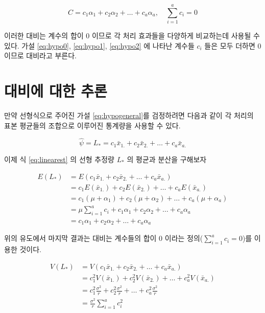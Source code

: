 \documentclass[
]{book}
\begin{document}
\begin{equation}
C = c_1 \alpha_1 + c_2 \alpha_2 + \dots + c_a \alpha_a, \quad \sum_{i=1}^a c_i =0
\label{eq:contrast}
\end{equation}

이러한 대비는 계수의 합이 0 이므로 각 처리 효과들을 다양하게 비교하는데 사용될 수 있다. 가설 \eqref{eq:hypo0}, \eqref{eq:hypo1}, \eqref{eq:hypo2} 에 나타난 계수들 \(c_i\) 들은 모두 더하면 0이므로 대비라고 부른다.

\hypertarget{uxb300uxbe44uxc5d0-uxb300uxd55c-uxcd94uxb860}{%
\section{대비에 대한 추론}\label{uxb300uxbe44uxc5d0-uxb300uxd55c-uxcd94uxb860}}

만약 선형식으로 주어진 가설 \eqref{eq:hypogeneral}를 검정하려면 다음과 같이 각 처리의 표본 평균들의 조합으로 이루어진 통계량을 사용할 수 있다.

\begin{equation}
\hat \psi = L_* = c_1 \bar x_{1.} + c_2 \bar x_{2.} + \dots + c_a \bar x_{a.}
\label{eq:linearest}
\end{equation}

이제 식 \eqref{eq:linearest} 의 선형 추정량 \(L_*\) 의 평균과 분산을 구해보자

\begin{align*}
E(L_*) & = E ( c_1 \bar x_{1.} + c_2 \bar x_{2.} + \dots + c_a \bar x_{a.} ) \\
  & = c_1 E(\bar x_{1.}) + c_2 E(\bar x_{2.}) + \dots + c_a E(\bar  x_{a.}) \\
  & = c_1 (\mu+ \alpha_1) + c_2 (\mu + \alpha_2) + \dots + c_a  (\mu + \alpha_a) \\
  & = \mu \sum_{i=1}^a c_i + c_1 \alpha_1 + c_2  \alpha_2 + \dots + c_a   \alpha_a \\
  & =  c_1 \alpha_1 + c_2  \alpha_2 + \dots + c_a   \alpha_a 
\end{align*}

위의 유도에서 마지막 결과는 대비는 계수들의 합이 0 이라는 정의(\(\sum_{i=1}^a c_i =0\))를 이용한 것이다.

\begin{align*}
V(L_*) & = V ( c_1 \bar x_{1.} + c_2 \bar x_{2.} + \dots + c_a \bar x_{a.} ) \\
  & = c_1^2 V(\bar x_{1.}) + c_2^2 V(\bar x_{2.}) + \dots + c_a^2 V(\bar  x_{a.}) \\
  & = c_1^2 \frac{\sigma^2}{r} + c_2^2 \frac{\sigma^2}{r} + \dots + c_a^2  \frac{\sigma^2}{r} \\
  & = \frac{\sigma^2}{r} \sum_{i=1}^a c_i^2
\end{align*}
\end{document}
